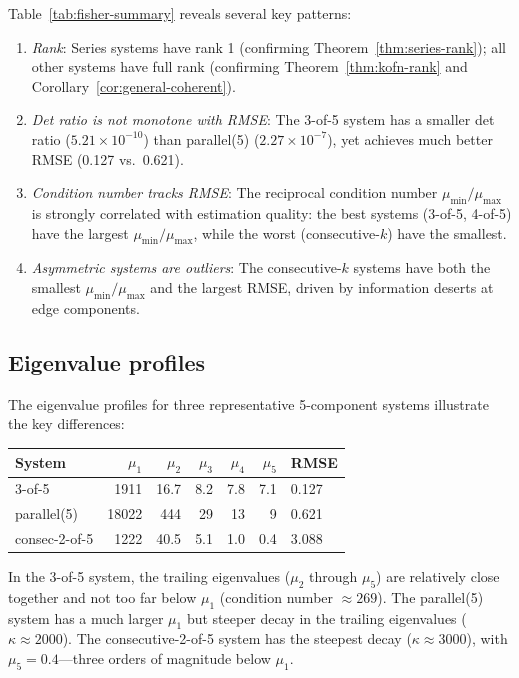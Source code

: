 \documentclass[12pt]{article}
\theoremstyle{definition}
\theoremstyle{remark}
\begin{document}
Table~\ref{tab:fisher-summary} reveals several key patterns:
\begin{enumerate}[leftmargin=2em]
  \item \emph{Rank}:  Series systems have rank 1 (confirming
    Theorem~\ref{thm:series-rank}); all other systems have full rank
    (confirming Theorem~\ref{thm:kofn-rank} and
    Corollary~\ref{cor:general-coherent}).

  \item \emph{Det ratio is not monotone with RMSE}:
    The 3-of-5 system has a smaller det ratio
    ($5.21 \times 10^{-10}$) than parallel(5)
    ($2.27 \times 10^{-7}$), yet achieves much better RMSE
    (0.127 vs.\ 0.621).

  \item \emph{Condition number tracks RMSE}:
    The reciprocal condition number $\mu_{\min}/\mu_{\max}$ is
    strongly correlated with estimation quality: the best systems
    (3-of-5, 4-of-5) have the largest $\mu_{\min}/\mu_{\max}$,
    while the worst (consecutive-$k$) have the smallest.

  \item \emph{Asymmetric systems are outliers}:
    The consecutive-$k$ systems have both the smallest
    $\mu_{\min}/\mu_{\max}$ and the largest RMSE, driven by
    information deserts at edge components.
\end{enumerate}

\subsection{Eigenvalue profiles}
\label{sec:ev-profiles}

The eigenvalue profiles for three representative 5-component systems
illustrate the key differences:

\begin{center}
\begin{tabular}{lrrrrrl}
\toprule
System & $\mu_1$ & $\mu_2$ & $\mu_3$ & $\mu_4$ & $\mu_5$ & RMSE \\
\midrule
3-of-5 & 1911 & 16.7 & 8.2 & 7.8 & 7.1 & 0.127 \\
parallel(5) & 18022 & 444 & 29 & 13 & 9 & 0.621 \\
consec-2-of-5 & 1222 & 40.5 & 5.1 & 1.0 & 0.4 & 3.088 \\
\bottomrule
\end{tabular}
\end{center}

In the 3-of-5 system, the trailing eigenvalues ($\mu_2$ through
$\mu_5$) are relatively close together and not too far below $\mu_1$
(condition number $\approx 269$).  The parallel(5) system has a much
larger $\mu_1$ but steeper decay in the trailing eigenvalues
($\kappa \approx 2000$).  The consecutive-2-of-5 system has the
steepest decay ($\kappa \approx 3000$), with $\mu_5 = 0.4$---three
orders of magnitude below $\mu_1$.
\end{document}
